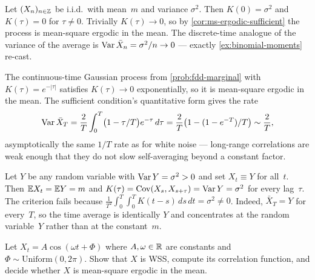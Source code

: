 \begin{example}
\label{ex:white-noise}
Let $(X_n)_{n \in \mathbb{Z}}$ be i.i.d.\ with mean~$m$ and variance
$\sigma^2$. Then $K(0) = \sigma^2$ and $K(\tau) = 0$ for
$\tau \neq 0$. Trivially $K(\tau) \to 0$, so by
\cref{cor:ms-ergodic-sufficient} the process is mean-square
ergodic in the mean. The discrete-time analogue of the variance
of the average is $\operatorname{Var} \bar X_n = \sigma^2/n \to 0$ — exactly
\cref{ex:binomial-moments} re-cast.
\end{example}

\begin{example}
\label{ex:ou-ergodic}
The continuous-time Gaussian process from \cref{prob:fdd-marginal}
with $K(\tau) = e^{-|\tau|}$ satisfies $K(\tau) \to 0$
exponentially, so it is mean-square ergodic in the mean. The
sufficient condition's quantitative form gives the rate
\[
  \operatorname{Var} \bar X_T = \frac{2}{T} \int_0^T \bigl(1 - \tau/T\bigr) e^{-\tau}\, d\tau = \frac{2}{T}\bigl(1 - (1 - e^{-T})/T\bigr) \sim \frac{2}{T},
\]
asymptotically the same $1/T$ rate as for white noise — long-range
correlations are weak enough that they do not slow self-averaging
beyond a constant factor.
\end{example}

\begin{example}
\label{ex:constant-process}
Let $Y$ be any random variable with $\operatorname{Var} Y = \sigma^2 > 0$ and
set $X_t \equiv Y$ for all~$t$. Then $\mathbb{E} X_t = \mathbb{E} Y = m$ and
$K(\tau) = \operatorname{Cov}(X_s, X_{s + \tau}) = \operatorname{Var} Y = \sigma^2$ for every
lag~$\tau$. The criterion fails because
$\frac{1}{T^2} \int_0^T \int_0^T K(t - s)\, ds\, dt = \sigma^2 \neq 0$.
Indeed, $\bar X_T = Y$ for every~$T$, so the time average is
identically $Y$ and concentrates at the random variable~$Y$
rather than at the constant~$m$.
\end{example}

\begin{problem}
\label{prob:periodic-ergodic}
Let $X_t = A \cos(\omega t + \Phi)$ where $A, \omega \in \mathbb{R}$ are
constants and $\Phi \sim \mathrm{Uniform}(0, 2\pi)$. Show that $X$
is WSS, compute its correlation function, and decide whether $X$
is mean-square ergodic in the mean.
\end{problem}

